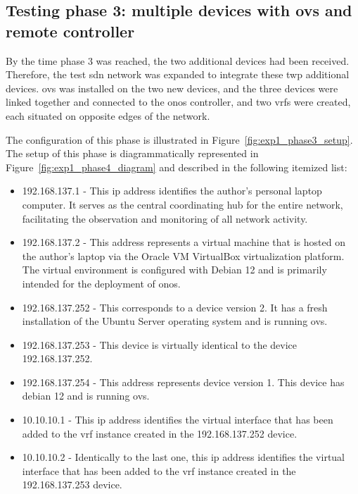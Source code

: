 \subsection[Testing phase 3: multiple devices with OvS and remote controller]{Testing phase 3: multiple devices with \gls{ovs} and remote controller}
By the time phase 3 was reached, the two additional devices had been received. Therefore, the test \gls{sdn} network was expanded to integrate these twp additional devices. \gls{ovs} was installed on the two new devices, and the three devices were linked together and connected to the \gls{onos} controller, and two \glspl{vrf} were created, each situated on opposite edges of the network. 

The configuration of this phase is illustrated in Figure~\ref{fig:exp1_phase3_setup}. The setup of this phase is diagrammatically represented in Figure~\ref{fig:exp1_phase4_diagram} and described in the following itemized list:

\begin{itemize}
	\item 192.168.137.1 - This \gls{ip} address identifies the author's personal laptop computer. It serves as the central coordinating hub for the entire network, facilitating the observation and monitoring of all network activity.
	\item 192.168.137.2 - This address represents a virtual machine that is hosted on the author's laptop via the Oracle VM VirtualBox virtualization platform. The virtual environment is configured with Debian 12 and is primarily intended for the deployment of \gls{onos}.
	\item 192.168.137.252 - This corresponds to a device version 2. It has a fresh installation of the Ubuntu Server operating system and is running \gls{ovs}.
	\item 192.168.137.253 - This device is virtually identical to the device 192.168.137.252.
	\item 192.168.137.254 - This address represents device version 1. This device has debian 12 and is running \gls{ovs}.
	\item 10.10.10.1 - This \gls{ip} address identifies the virtual interface that has been added to the \gls{vrf} instance created in the 192.168.137.252 device.
	\item 10.10.10.2 - Identically to the last one, this \gls{ip} address identifies the virtual interface that has been added to the \gls{vrf} instance created in the 192.168.137.253 device.
\end{itemize}

